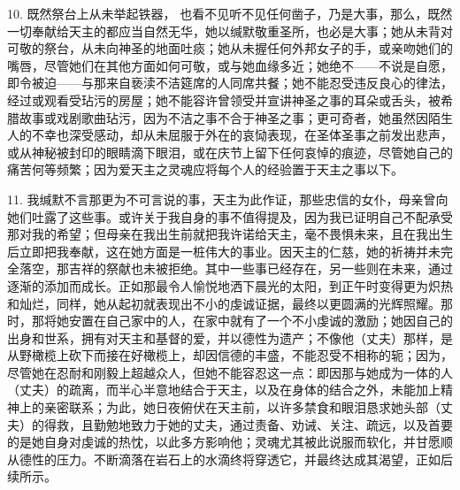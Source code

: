 10. 既然祭台上从未举起铁器，\newline{} 也看不见听不见任何凿子，乃是大事，那么，既然一切奉献给天主的都应当自然无华，她以缄默敬重圣所，也必是大事；她从未背对可敬的祭台，从未向神圣的地面吐痰；她从未握任何外邦女子的手，或亲吻她们的嘴唇，尽管她们在其他方面如何可敬，或与她血缘多近；她绝不——不说是自愿，即令被迫——与那来自亵渎不洁筵席的人同席共餐；她不能忍受违反良心的律法，经过或观看受玷污的房屋；她不能容许曾领受并宣讲神圣之事的耳朵或舌头，被希腊故事或戏剧歌曲玷污，因为不洁之事不合于神圣之事；更可奇者，她虽然因陌生人的不幸也深受感动，却从未屈服于外在的哀恸表现，在圣体圣事之前发出悲声，或从神秘被封印的眼睛滴下眼泪，或在庆节上留下任何哀悼的痕迹，尽管她自己的痛苦何等频繁；因为爱天主之灵魂应将每个人的经验置于天主之事以下。\par

11. 我缄默不言那更为不可言说的事，天主为此作证，那些忠信的女仆，母亲曾向她们吐露了这些事。或许关于我自身的事不值得提及，因为我已证明自己不配承受那对我的希望；但母亲在我出生前就把我许诺给天主，毫不畏惧未来，且在我出生后立即把我奉献，这在她方面是一桩伟大的事业。因天主的仁慈，她的祈祷并未完全落空，那吉祥的祭献也未被拒绝。其中一些事已经存在，另一些则在未来，通过逐渐的添加而成长。正如那最令人愉悦地洒下晨光的太阳，到正午时变得更为炽热和灿烂，同样，她从起初就表现出不小的虔诚证据，最终以更圆满的光辉照耀。那时，那将她安置在自己家中的人，在家中就有了一个不小虔诚的激励；她因自己的出身和世系，拥有对天主和基督的爱，并以德性为遗产；不像他（丈夫）那样，是从野橄榄上砍下而接在好橄榄上，却因信德的丰盛，不能忍受不相称的轭；因为，尽管她在忍耐和刚毅上超越众人，但她不能容忍这一点：即因那与她成为一体的人（丈夫）的疏离，而半心半意地结合于天主，以及在身体的结合之外，未能加上精神上的亲密联系；为此，她日夜俯伏在天主前，以许多禁食和眼泪恳求她头部（丈夫）的得救，且勤勉地致力于她的丈夫，通过责备、劝诫、关注、疏远，以及首要的是她自身对虔诚的热忱，以此多方影响他；灵魂尤其被此说服而软化，并甘愿顺从德性的压力。不断滴落在岩石上的水滴终将穿透它，并最终达成其渴望，正如后续所示。\par

